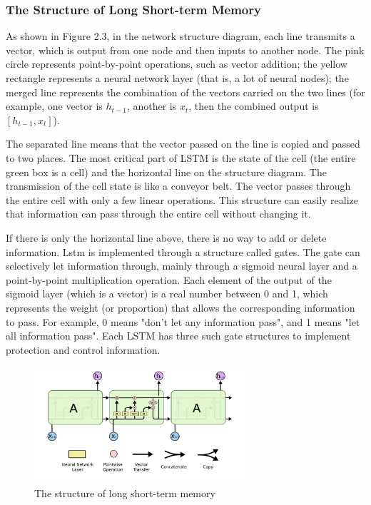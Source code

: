 \subsubsection{The Structure of Long Short-term Memory}
As shown in Figure 2.3, in the network structure diagram, each line transmits a vector, which is output from one node and then inputs to another node. The pink circle represents point-by-point operations, such as vector addition; the yellow rectangle represents a neural network layer (that is, a lot of neural nodes); the merged line represents the combination of the vectors carried on the two lines (for example, one vector is $h_{t-1}$, another is $x_{t}$, then the combined output is $[h_{t-1}, x_{t}] $). 

The separated line means that the vector passed on the line is copied and passed to two places. The most critical part of LSTM is the state of the cell (the entire green box is a cell) and the horizontal line on the structure diagram. The transmission of the cell state is like a conveyor belt. The vector passes through the entire cell with only a few linear operations. This structure can easily realize that information can pass through the entire cell without changing it.

If there is only the horizontal line above, there is no way to add or delete information. Lstm is implemented through a structure called gates. The gate can selectively let information through, mainly through a sigmoid neural layer and a point-by-point multiplication operation. Each element of the output of the sigmoid layer (which is a vector) is a real number between 0 and 1, which represents the weight (or proportion) that allows the corresponding information to pass. For example, 0 means "don't let any information pass", and 1 means "let all information pass". Each LSTM has three such gate structures to implement protection and control information\cite{LSTM-github}.
\begin{figure}[H]
\centering  %
\includegraphics[width=0.7\textwidth]{LSTM.png}
\caption{The structure of long short-term memory}
\end{figure}
